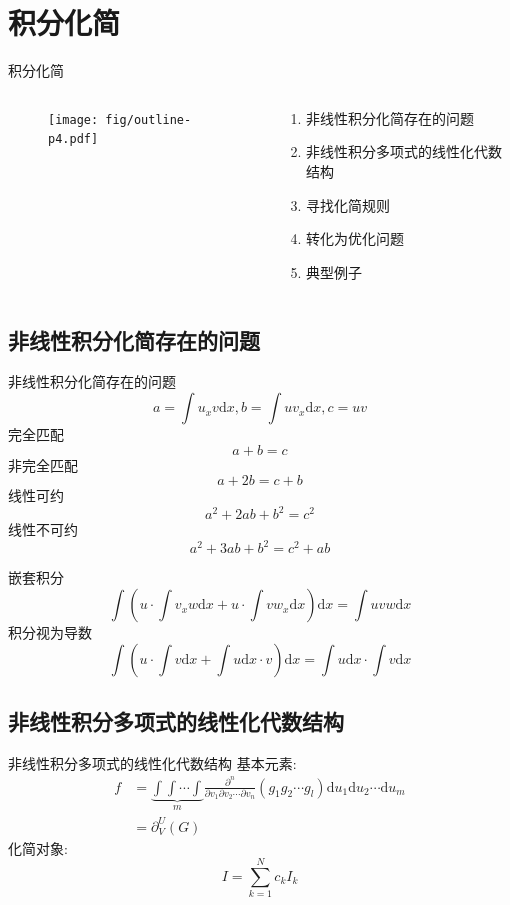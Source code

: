\documentclass[handout]{beamer}
\newcommand{\dd}[1]{\mathrm{d}#1}
\begin{document}
\section{积分化简}
\begin{frame}{积分化简}
\begin{columns}
\begin{column}{0.4\textwidth}
  \begin{figure}
    \centering
    \texttt{[image: fig/outline-p4.pdf]}
  \end{figure}
\end{column}
\begin{column}{0.6\textwidth}
  \begin{enumerate}
  \item 非线性积分化简存在的问题
  \item 非线性积分多项式的线性化代数结构 
  \item 寻找化简规则 
  \item 转化为优化问题
  \item 典型例子 
  \end{enumerate}
\end{column}
\end{columns}
\end{frame}

\subsection{非线性积分化简存在的问题}
\begin{frame}{非线性积分化简存在的问题}
\[
    a=\int{u_x v \dd x},b=\int{u v_x \dd x},c=uv
\]
完全匹配
\[
    a+b=c
\]
非完全匹配
\[
    a+2b=c+b
\]
线性可约
\[
    a^2+2ab+b^2=c^2
\]
线性不可约
\[
    a^2+3ab+b^2=c^2+ab
\]
\end{frame}

\begin{frame}
嵌套积分
\[
    \int\!{\left(u\cdot\int\!{v_xw\dd x}+u\cdot\int\!{vw_x\dd x}\right)\dd x}=\int\!{uvw\dd x}
\]
积分视为导数
\[
    \int\!{\left(u\cdot\int\!{v\dd x}+\int\!{u\dd x}\cdot v\right)\dd x}=\int\!{u\dd x}\cdot\int\!{v\dd x}
\]
\end{frame}

\subsection{非线性积分多项式的线性化代数结构}
\begin{frame}{非线性积分多项式的线性化代数结构}
基本元素:
\[
\begin{aligned}
    f&=\underbrace{\int\!\int\!\cdots\!\int}_m{ \frac{\partial^n}{\partial v_1 \partial v_2 \cdots \partial v_n} (g_1 g_2 \cdots g_l)\dd u_1 \dd u_2 \cdots \dd u_m} \\ 
    &=\partial^U_V(G)
\end{aligned}
\]
化简对象:
\[
    I = \sum_{k=1}^N{c_k I_k}
\]
\end{frame}
\end{document}
